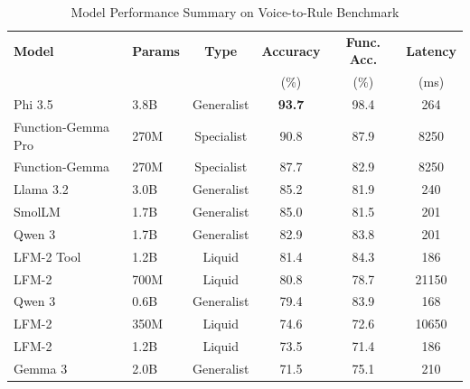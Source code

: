 \begin{table}[htbp]
\centering
\caption{Model Performance Summary on Voice-to-Rule Benchmark}
\label{tab:model_results}
\begin{tabular}{llcccc}
\toprule
\textbf{Model} & \textbf{Params} & \textbf{Type} & \textbf{Accuracy} & \textbf{Func. Acc.} & \textbf{Latency} \\
 & & & (\%) & (\%) & (ms) \\
\midrule
Phi 3.5 & 3.8B & Generalist & \textbf{93.7} & 98.4 & 264 \\
Function-Gemma Pro & 270M & Specialist & 90.8 & 87.9 & 8250 \\
Function-Gemma & 270M & Specialist & 87.7 & 82.9 & 8250 \\
Llama 3.2 & 3.0B & Generalist & 85.2 & 81.9 & 240 \\
SmolLM & 1.7B & Generalist & 85.0 & 81.5 & 201 \\
Qwen 3 & 1.7B & Generalist & 82.9 & 83.8 & 201 \\
LFM-2 Tool & 1.2B & Liquid & 81.4 & 84.3 & 186 \\
LFM-2 & 700M & Liquid & 80.8 & 78.7 & 21150 \\
Qwen 3 & 0.6B & Generalist & 79.4 & 83.9 & 168 \\
LFM-2 & 350M & Liquid & 74.6 & 72.6 & 10650 \\
LFM-2 & 1.2B & Liquid & 73.5 & 71.4 & 186 \\
Gemma 3 & 2.0B & Generalist & 71.5 & 75.1 & 210 \\
\bottomrule
\end{tabular}
\end{table}